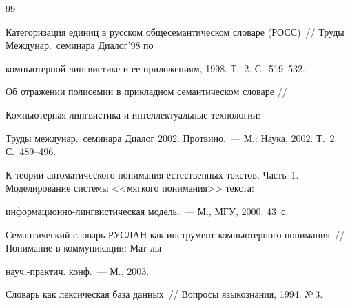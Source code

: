    


{\small\frenchspacing


{%




\begin{thebibliography}{99}









Категоризация единиц в русском общесемантическом словаре (РОСС)~/\!\!/ Труды Междунар.\ семинара Диалог'98 по 


компьютерной лингвистике и ее приложениям, 1998. Т.~2. С.~519--532.






Об отражении полисемии в прикладном семантическом словаре /\!\!/


Компьютерная лингвистика и интеллектуальные технологии: 


Труды междунар.\ семинара Диалог 2002. Протвино.~--- М.: Наука, 2002. Т.~2. С.~489--496.






К теории автоматического понимания естественных текстов. Часть~1. Моделирование системы <<мягкого понимания>> текста: 


информационно-линг\-ви\-сти\-че\-ская модель.~--- М., МГУ, 2000. 43~с.









Семантический словарь РУСЛАН как инструмент компьютерного понимания~/\!\!/ Понимание в коммуникации: Мат-лы 


науч.-практич. конф.~--- М., 2003. 









Словарь как лексическая база данных~/\!\!/ Вопросы языкознания, 1994. №\,3.








\end{thebibliography}}}
